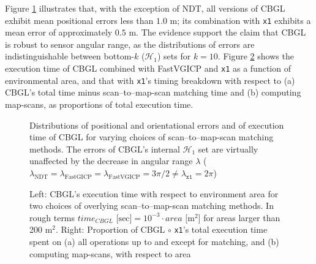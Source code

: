 Figure \ref{fig:c:errors_and_time} illustrates that, with the exception of NDT,
all versions of CBGL exhibit mean positional errors less than $1.0$ m; its
combination with \texttt{x1} exhibits a mean error of approximately $0.5$ m.
The evidence support the claim that CBGL is robust to sensor angular range, as
the distributions of errors are indistinguishable between bottom-$k$
($\mathcal{H}_1$) sets for $k=10$. Figure \ref{fig:c:time_analysis} shows the
execution time of CBGL combined with FastVGICP and \texttt{x1} as a function of
environmental area, and that with \texttt{x1}'s timing breakdown with respect
to (a) CBGL's total time minus scan--to--map-scan matching time and (b)
computing map-scans, as proportions of total execution time.

\begin{figure}
  
  \vspace{0.1cm}
  \caption{\small Distributions of positional and orientational errors and of
           execution time of CBGL for varying choices of scan--to--map-scan
           matching methods. The errors of CBGL's internal $\mathcal{H}_1$ set
           are virtually unaffected by the decrease in angular range $\lambda$
           ($\lambda_{\text{NDT}} = \lambda_{\text{FastGICP}} =
           \lambda_{\text{FastVGICP}} = 3\pi/2 \neq \lambda_{\texttt{x1}} = 2\pi$)
           }
  \label{fig:c:errors_and_time}
\end{figure}

\begin{figure}
  \vspace{0.5cm}
  
  \vspace{0.6cm}
  \caption{\small Left: CBGL's execution time with respect to environment area
           for two choices of overlying scan--to--map-scan matching methods. In
           rough terms $time_{CBGL} \text{ [sec]} = 10^{-3}\cdot area
           \text{ [} \text{m}^2 \text{]}$ for areas larger than 200 m$^2$.
           Right: Proportion of CBGL $\circ$ \texttt{x1}'s total execution time
           spent on (a) all operations up to and except for matching, and (b)
           computing map-scans, with respect to area}
  \vspace{-0.5cm}
  \label{fig:c:time_analysis}
\end{figure}
